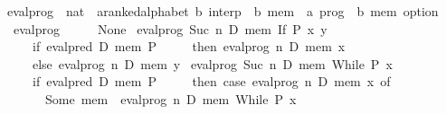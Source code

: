 \begin{isabellebody}
\isanewline
{}\isamarkupfalse%
\ eval{}prog\ {}{}\ {}nat\ {}\ {}{}a{}{}ranked{}alphabet{}\ {}b{}\ interp\ {}\ {}b\ mem\ {}\ {}a\ prog\ {}\ {}b\ mem\ option{}\ \isanewline
\ \ {}eval{}prog\ {}\ {}\ {}\ {}\ {}\ None{}\isanewline
{}\ {}eval{}prog\ {}Suc\ n{}\ D\ mem\ {}If\ P\ x\ y{}\ {}\isanewline
\ \ \ \ \ {}if\ eval{}pred\ D\ mem\ P\isanewline
\ \ \ \ \ then\ eval{}prog\ n\ D\ mem\ x\isanewline
\ \ \ \ \ else\ eval{}prog\ n\ D\ mem\ y{}{}\isanewline
{}\ {}eval{}prog\ {}Suc\ n{}\ D\ mem\ {}While\ P\ x{}\ {}\isanewline
\ \ \ \ \ {}if\ eval{}pred\ D\ mem\ P\isanewline
\ \ \ \ \ then\ case\ eval{}prog\ n\ D\ mem\ x\ of\isanewline
\ \ \ \ \ \ \ Some\ mem{}\ {}\ eval{}prog\ n\ D\ mem{}\ {}While\ P\ x{}\isanewline

\end{isabellebody}
